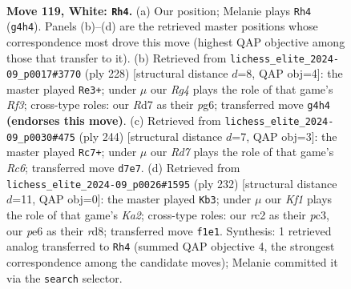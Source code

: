 \documentclass[11pt]{article}
\begin{document}
\clearpage

\begin{figure}[p]\centering
\begin{subfigure}{0.46\textwidth}\centering
\resizebox{\linewidth}{!}{%
\newchessgame
\chessboard[
  setfen={1k6/3R4/4p3/4P3/5PR1/8/2r5/5K2 w - - 23 119},
  showmover=false,
  pgfstyle=straightmove, color=movearrow, markmove={g4-h4}
]}
\caption{}
\end{subfigure}\hfill
\begin{subfigure}{0.46\textwidth}\centering
\resizebox{\linewidth}{!}{%
\newchessgame
\chessboard[
  setfen={8/r7/4k1p1/7p/7P/5RP1/8/6K1 w - - 66 115},
  showmover=false,
  pgfstyle=straightmove, color=movearrow, markmove={f3-e3}
]}
\caption{}
\end{subfigure}
\\[4pt]
\begin{subfigure}{0.46\textwidth}\centering
\resizebox{\linewidth}{!}{%
\newchessgame
\chessboard[
  setfen={8/6k1/2R5/7p/7P/6P1/6K1/1r6 w - - 91 123},
  showmover=false,
  pgfstyle=straightmove, color=movearrow, markmove={c6-c7}
]}
\caption{}
\end{subfigure}\hfill
\begin{subfigure}{0.46\textwidth}\centering
\resizebox{\linewidth}{!}{%
\newchessgame
\chessboard[
  setfen={3r4/P6R/8/1k6/8/2p5/K7/8 w - - 2 117},
  showmover=false,
  pgfstyle=straightmove, color=movearrow, markmove={a2-b3}
]}
\caption{}
\end{subfigure}
\caption{\textbf{Move 119, White: \texttt{Rh4}.} (a) Our position; Melanie plays \texttt{Rh4} (\texttt{g4h4}). Panels (b)--(d) are the retrieved master positions whose correspondence most drove this move (highest QAP objective among those that transfer to it). (b) Retrieved from \texttt{lichess\_elite\_2024-09\_p0017\#3770} (ply 228) [structural distance $d$=8, QAP obj=4]: the master played \texttt{Re3+}; under $\mu$ our \emph{Rg4} plays the role of that game's \emph{Rf3}; cross-type roles: our \emph{R}d7 as their \emph{p}g6; transferred move \texttt{g4h4} \textbf{(endorses this move)}. (c) Retrieved from \texttt{lichess\_elite\_2024-09\_p0030\#475} (ply 244) [structural distance $d$=7, QAP obj=3]: the master played \texttt{Rc7+}; under $\mu$ our \emph{Rd7} plays the role of that game's \emph{Rc6}; transferred move \texttt{d7e7}. (d) Retrieved from \texttt{lichess\_elite\_2024-09\_p0026\#1595} (ply 232) [structural distance $d$=11, QAP obj=0]: the master played \texttt{Kb3}; under $\mu$ our \emph{Kf1} plays the role of that game's \emph{Ka2}; cross-type roles: our \emph{r}c2 as their \emph{p}c3, our \emph{p}e6 as their \emph{r}d8; transferred move \texttt{f1e1}. Synthesis: 1 retrieved analog transferred to \texttt{Rh4} (summed QAP objective 4, the strongest correspondence among the candidate moves); Melanie committed it via the \texttt{search} selector.}
\label{fig:thought-m236}
\end{figure}
\end{document}
